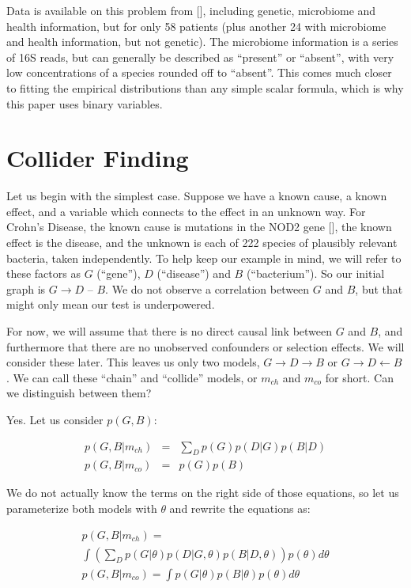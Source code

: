 \documentclass[letterpaper]{article}
\begin{document}
Data is available on this problem from [\cite{data}], including
genetic, microbiome and
health information, but for only 58 patients (plus another 24 with
microbiome and health information, but not genetic).  The microbiome
information is a series of 16S reads, but can generally be described
as ``present'' or ``absent'', with very low concentrations of a
species rounded off to ``absent''.  This comes much closer to fitting
the empirical distributions than any simple scalar formula, which is
why this paper uses binary variables.

\section{Collider Finding}

Let us begin with the simplest case.  Suppose we have a known cause, a
known effect, and a variable which connects to the effect in an
unknown way.   For Crohn's Disease, the known cause is mutations in the NOD2
gene [\cite{nod2}], the known effect is the disease, and the unknown
is each of 222 species of plausibly relevant bacteria, taken
independently.  To help keep our example in mind, we will refer to
these factors as $G$ (``gene''), $D$ (``disease'') and $B$
(``bacterium'').  So our initial graph is $G \rightarrow D$ -- $B$.
We do not observe a
correlation between $G$ and $B$, but that might only mean our test is
underpowered.  

For now, we will assume that there is no direct causal
link between $G$ and $B$, and furthermore that there are no unobserved
confounders or selection effects.  We will consider these later.
This leaves us only two models, $G \rightarrow D \rightarrow B$ or $G
\rightarrow D \leftarrow B$.  We can call these ``chain'' and
``collide'' models, or $m_{ch}$ and $m_{co}$ for short.  Can we
distinguish between them?

Yes.  Let us consider
$p(G,B)$:

\begin{eqnarray*}
p(G,B|m_{ch}) & = & \sum_D p(G)p(D|G)p(B|D) \\
p(G,B|m_{co}) & = & p(G)p(B)
\end{eqnarray*}

We do not actually know the terms on the right side of those
equations, so let us parameterize both models with $\theta$ and
rewrite the equations as:


\begin{multline*}
  p(G,B|m_{ch}) = \\
  \int \left ( \sum_D p(G|\theta) p(D|G,\theta) 
  p(B|D,\theta) \right ) p(\theta) d\theta \\
  p(G,B|m_{co}) = \int p(G|\theta)p(B|\theta)p(\theta) d\theta
\end{multline*}
\end{document}
